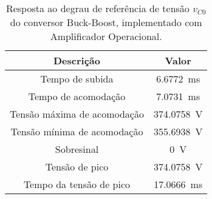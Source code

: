 \begin{table}[!ht]
\centering
\caption{Resposta ao degrau de referência de tensão $v_{C0}$ do conversor Buck-Boost, implementado com Amplificador Operacional.}
\label{tab:parametros}
\begin{tabular}{@{}cc@{}}
\toprule
\textbf{Descrição} & \textbf{Valor}\\ \midrule
Tempo de subida & \SI{6.6772}{\milli\s}\\
Tempo de acomodação & \SI{7.0731}{\milli\s}\\
Tensão máxima de acomodação & \SI{374.0758}{\V}\\
Tensão mínima de acomodação & \SI{355.6938}{\V}\\
Sobresinal & \SI{0}{\V}\\
Tensão de pico & \SI{374.0758}{\V}\\
Tempo da tensão de pico & \SI{17.0666}{\milli\s}\\
\bottomrule
\end{tabular}
\end{table}

